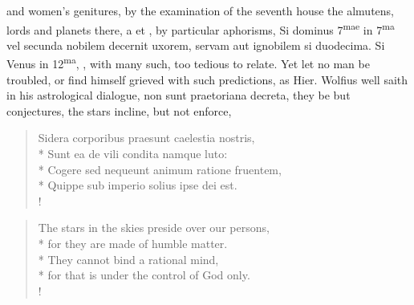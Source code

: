 and women's genitures, by the examination of the seventh house the
almutens, lords and planets there, a \leftmoon{} et \astrosun{} \etc{}, by particular
aphorisms, Si dominus 7\textsuperscript{mae} in 7\textsuperscript{ma} vel secunda nobilem decernit uxorem,
servam aut ignobilem si duodecima. Si Venus in 12\textsuperscript{ma}, \etc{}, with many
such, too tedious to relate. Yet let no man be troubled, or find
himself grieved with such predictions, as Hier. Wolfius well saith in
his astrological dialogue, non sunt praetoriana decreta, they be
but conjectures, the stars incline, but not enforce,
%
\begin{latin}%
\begin{verse}%
Sidera corporibus praesunt caelestia nostris,\\*
Sunt ea de vili condita namque luto:\\*
Cogere sed nequeunt animum ratione fruentem,\\*
Quippe sub imperio solius ipse dei est.\\!
\end{verse}%
\end{latin}%
\translationrule%
\begin{verse}%
The stars in the skies preside over our persons,\\*
for they are made of humble matter.\\*
They cannot bind a rational mind,\\*
for that is under the control of God only.\\!
\end{verse}%

